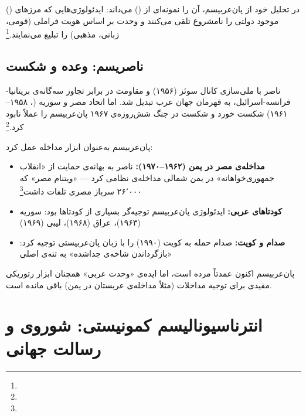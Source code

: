  () در تحلیل خود از پان‌عربیسم، آن را نمونه‌ای از  () می‌داند: ایدئولوژی‌هایی که مرزهای موجود دولتی را نامشروع تلقی می‌کنند و وحدت بر اساس هویت فراملی (قومی، زبانی، مذهبی) را تبلیغ می‌نمایند.\footnote{}

\subsection{ناصریسم: وعده و شکست}
\label{subsec:ch13-nasserism}

ناصر با ملی‌سازی کانال سوئز (۱۹۵۶) و مقاومت در برابر تجاوز سه‌گانه‌ی بریتانیا-فرانسه-اسرائیل، به قهرمان جهان عرب تبدیل شد. اما اتحاد مصر و سوریه (، ۱۹۵۸–۱۹۶۱) شکست خورد و شکست در جنگ شش‌روزه‌ی ۱۹۶۷ پان‌عربیسم را عملاً نابود کرد.\footnote{}

\begin{tcolorbox}[wavebox, title={پان‌عربیسم و مداخله}]
پان‌عربیسم به‌عنوان ابزار مداخله عمل کرد:
\begin{itemize}
\item \textbf{مداخله‌ی مصر در یمن (۱۹۶۲–۱۹۷۰):} ناصر به بهانه‌ی حمایت از «انقلاب جمهوری‌خواهانه» در یمن شمالی مداخله‌ی نظامی کرد — «ویتنام مصر» که ۲۶٬۰۰۰ سرباز مصری تلفات داشت\footnote{}
\item \textbf{کودتاهای عربی:} ایدئولوژی پان‌عربیسم توجیه‌گر بسیاری از کودتاها بود: سوریه (۱۹۶۳)، عراق (۱۹۶۸)، لیبی (۱۹۶۹)
\item \textbf{صدام و کویت:} صدام حمله به کویت (۱۹۹۰) را با زبان پان‌عربیستی توجیه کرد: «بازگرداندن شاخه‌ی جداشده» به تنه‌ی اصلی
\end{itemize}
\end{tcolorbox}

پان‌عربیسم اکنون عمدتاً مرده است، اما ایده‌ی «وحدت عربی» همچنان ابزار رتوریکی مفیدی برای توجیه مداخلات (مثلاً مداخله‌ی عربستان در یمن) باقی مانده است.


\section{انترناسیونالیسم کمونیستی: شوروی و رسالت جهانی}
\label{sec:ch13-communism}

